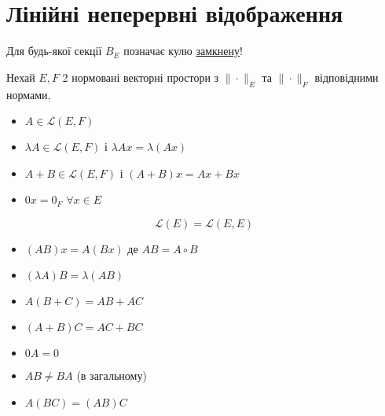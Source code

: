 \section{Лінійні неперервні відображення}
Для будь-якої секції $B_E$ позначає кулю \underline{замкнену}!
\par
Нехай $E, F$ 2 нормовані векторні простори з $\| \cdot \|_{E}$ та $\| \cdot \|_{F}$ відповідними нормами, 
\begin{itemize}
    \item $A \in \mathcal{L}(E, F)$
    \item $\lambda A \in \mathcal{L}(E, F)$ і $\lambda Ax = \lambda(Ax)$
    \item $A + B \in \mathcal{L}(E, F)$ і $(A + B)x = Ax + Bx$
    \item $0x = 0_F$ $\forall x \in E$
\end{itemize}
\[
    \mathcal{L}(E) = \mathcal{L}(E, E)
\] 
\begin{itemize}
    \item $(AB)x = A(Bx)$ де $AB = A \circ B$
    \item $(\lambda A)B = \lambda (AB)$
    \item $A(B + C) = AB + AC$
    \item $(A + B)C = AC + BC$
    \item $0A = 0$ 
    \item $AB \neq BA$ (в загальному)
    \item $A(BC) = (AB)C$
\end{itemize}


